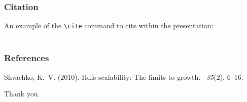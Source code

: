 \documentclass{beamer}
\begin{document}
\begin{frame}[fragile] %
\frametitle{Citation}
An example of the \verb|\cite| command to cite within the presentation:\\~

\end{frame}


\begin{frame}
\frametitle{References}
\footnotesize{
\begin{thebibliography}{99} %

Shvachko, K.~V. (2010).
\newblock Hdfs scalability: The limits to growth.
~{\em 35\/}(2), 6--16.

\end{thebibliography}
}
\end{frame}


\begin{frame}
\Huge{\centerline{Thank you.}}
\end{frame}

\end{document}
